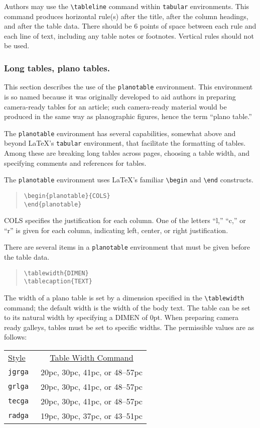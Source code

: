 Authors may use the \verb"\tableline" command within {\tt tabular} 
environments.  This command produces horizontal rule(s) after the title, 
after the column headings, and after the table data.  There should be 6 
points of space between each rule and each line of text, including any 
table notes or footnotes.  Vertical rules should not be used.

\subsubsection{Long tables, plano tables.}\label{tbl-sec}
This section describes the use of the {\tt planotable} environment.
This environment is so named because it was originally developed 
to aid authors in preparing camera-ready tables for an article; 
such camera-ready material would be produced in the same way 
as planographic figures, hence the term ``plano table.''

The {\tt planotable} environment has several capabilities, somewhat 
above and beyond \LaTeX's {\tt tabular} environment, that facilitate 
the formatting of tables.  Among these are breaking long tables across 
pages, choosing a table width, and specifying comments and references 
for tables.

The {\tt planotable} environment uses \LaTeX's familiar 
\verb"\begin" and \verb"\end" constructs.
\begin{quote}
\verb"\begin{planotable}{COLS}"\\
\verb"\end{planotable}"
\end{quote}
{\small COLS} specifies the justification for each column. 
One of the letters ``l,'' ``c,'' or ``r'' is given for each 
column, indicating left, center, or right justification.  

There are several items in a {\tt planotable} environment 
that must be given before the table data.
\begin{quote}
\verb"\tablewidth{DIMEN}"\\
\verb"\tablecaption{TEXT}"
\end{quote}
The width of a plano table is set by a dimension specified in the 
\verb"\tablewidth" command; the default width is the width of the 
body text.  The table can be set to its natural width by specifying 
a {\small DIMEN} of 0pt.  When preparing camera ready galleys, tables 
must be set to specific widths.  The permissible values are as follows:
\begin{center}
\begin{tabular}{p{0.5in}c}
\underline{Style} & \underline{Table Width Command}\\
\tt jgrga & 20pc, 30pc, 41pc, or 48--57pc\\
\tt grlga & 20pc, 30pc, 41pc, or 48--57pc\\
\tt tecga & 20pc, 30pc, 41pc, or 48--57pc\\
\tt radga & 19pc, 30pc, 37pc, or 43--51pc\\
\end{tabular}
\end{center}

